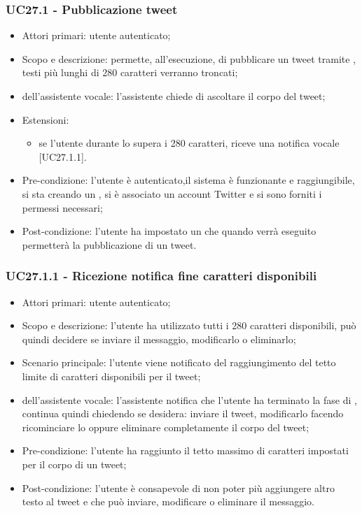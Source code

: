 \subsubsection{UC27.1 - Pubblicazione tweet}
\begin{itemize}
	\item  Attori primari: utente autenticato;
	\item  Scopo e descrizione: permette, all'esecuzione, di pubblicare un tweet tramite , testi più lunghi di 280 caratteri verranno troncati;
	\item  {} dell'assistente vocale: l'assistente chiede di ascoltare il corpo del tweet;
	\item  Estensioni: 
		   \begin{itemize}
				\item se l'utente durante lo  supera i 280 caratteri, riceve una notifica vocale [UC27.1.1].
		   \end{itemize}
	\item  Pre-condizione: l'utente è autenticato,il sistema è funzionante e raggiungibile, si sta creando un , si è associato un account Twitter e si sono forniti i permessi necessari;
	\item  Post-condizione: l'utente ha impostato un  che quando verrà eseguito permetterà la pubblicazione di un tweet.
\end{itemize}
\subsubsection{UC27.1.1 - Ricezione notifica fine caratteri disponibili}
\begin{itemize}
	\item  Attori primari: utente autenticato;
	\item  Scopo e descrizione: l'utente ha utilizzato tutti i 280 caratteri disponibili, può quindi decidere se inviare il messaggio, modificarlo o eliminarlo;
	\item  Scenario principale: l'utente viene notificato del raggiungimento del tetto limite di caratteri disponibili per il tweet;
	\item  {} dell'assistente vocale: l'assistente notifica che l'utente ha terminato la fase di , continua quindi chiedendo se desidera: inviare il tweet, modificarlo facendo ricominciare lo  oppure eliminare completamente il corpo del tweet;
	\item  Pre-condizione: l'utente ha raggiunto il tetto massimo di caratteri impostati per il corpo di un tweet;
	\item  Post-condizione: l'utente è consapevole di non poter più aggiungere altro testo al tweet e che può inviare, modificare o eliminare il messaggio.
\end{itemize}
